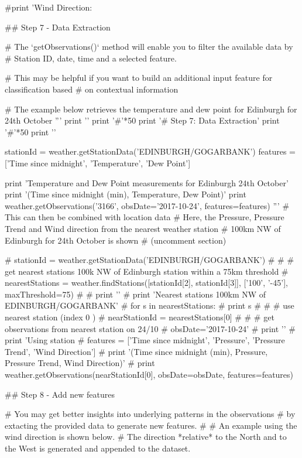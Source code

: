 \documentclass[12pt]{article}
\begin{document}
\begin{python}
#print 'Wind Direction: %

## Step 7 - Data Extraction

# The `getObservations()` method will enable you to filter the available data by
# Station ID, date, time and a selected feature.

# This may be helpful if you want to build an additional input feature for classification based
# on contextual information

# The example below retrieves the temperature and dew point for Edinburgh for 24th October
'''
print '\n'
print '#'*50
print '# Step 7: Data Extraction'
print '#'*50
print '\n'

stationId = weather.getStationData('EDINBURGH/GOGARBANK')
features = ['Time since midnight', 'Temperature', 'Dew Point']

print 'Temperature and Dew Point measurements for Edinburgh 24th October'
print '(Time since midnight (min), Temperature, Dew Point)'
print weather.getObservations('3166', obsDate='2017-10-24', features=features)
'''
# This can then be combined with location data
# Here, the Pressure, Pressure Trend and Wind direction from the nearest weather station
# 100km NW of Edinburgh for 24th October is shown
# (uncomment section)

# stationId = weather.getStationData('EDINBURGH/GOGARBANK')
#
# # get nearest stations 100k NW of Edinburgh station within a 75km threshold
# nearestStations = weather.findStations([stationId[2], stationId[3]], ['100', '-45'], maxThreshold=75)
#
# print '\n'
# print 'Nearest stations 100km NW of EDINBURGH/GOGARBANK'
# for s in nearestStations:
#     print s
#
# # use nearest station (index 0 )
# nearStationId = nearestStations[0]
#
# # get observations from nearest station on 24/10
# obsDate='2017-10-24'
# print '\n'
# print 'Using station %
# features = ['Time since midnight', 'Pressure', 'Pressure Trend', 'Wind Direction']
# print '(Time since midnight (min), Pressure, Pressure Trend, Wind Direction)'
# print weather.getObservations(nearStationId[0], obsDate=obsDate, features=features)

## Step 8 - Add new features

# You may get better insights into underlying patterns in the observations
# by extacting the provided data to generate new features.
#
# An example using the wind direction is shown below.
# The direction *relative* to the North and to the West is generated and appended to the dataset.


\end{python}
\end{document}
